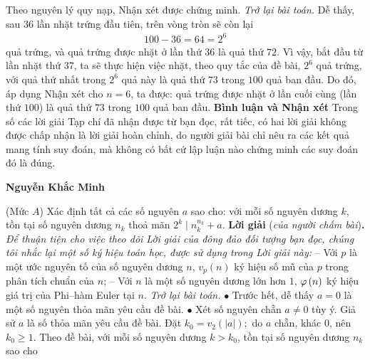 \begin{multicols}{2}
	\vskip 0.05cm
	Theo nguyên lý quy nạp, Nhận xét được chứng minh.
	\vskip 0.05cm
	\textit{Trở lại bài toán.}
	\vskip 0.05cm
	Dễ thấy, sau $36$ lần nhặt trứng đầu tiên, trên vòng tròn sẽ còn lại
	\begin{align*}
		100 - 36 = 64 = {2^6}
	\end{align*}
	quả trứng, và quả trứng được nhặt ở lần thứ $36$ là quả thứ $ 72$.
	\vskip 0.05cm
	Vì vậy, bắt đầu từ lần nhặt thứ $37$, ta sẽ thực hiện việc nhặt, theo quy tắc của đề bài, $2^6$  quả trứng, với quả thứ nhất trong $2^6$  quả này là quả thứ $73$ trong $100$ quả ban đầu. Do đó, áp dụng Nhận xét cho $n = 6$, ta được: quả trứng được nhặt ở lần cuối cùng (lần thứ $100$) là quả thứ $73$ trong $100$ quả ban đầu.
	\vskip 0.05cm
	\textbf{\color{thachthuctoanhoc}Bình luận và Nhận xét}
	\vskip 0.05cm
	Trong số các lời giải Tạp chí đã nhận được từ bạn đọc, rất tiếc, có hai lời giải không được chấp nhận là lời giải hoàn chỉnh, do người giải bài chỉ nêu ra các kết quả mang tính suy đoán, mà không có bất cứ lập luận nào chứng minh các suy đoán đó là đúng.
	\begin{flushright}
		\textbf{\color{thachthuctoanhoc}Nguyễn Khắc Minh}
	\end{flushright}
	{}
	(Mức $A$) Xác định tất cả các số nguyên $a$ sao cho: với mỗi số nguyên dương $k$, tồn tại số nguyên dương $n_k$ thoả mãn $2^k\mid n_k^{n_k}+a$. 
	\vskip 0.05cm
	\textbf{\color{thachthuctoanhoc}Lời giải} (\textit{của người chấm bài})\textbf{\color{thachthuctoanhoc}.}
	\vskip 0.05cm
	\textit{Để thuận tiện cho việc theo dõi Lời giải của đông đảo đối tượng bạn đọc, chúng tôi nhắc lại một số ký hiệu toán học, được sử dụng trong Lời giải này:}
	\vskip 0.05cm
	-- Với $p$ là một ước nguyên tố của số nguyên dương $n$, ${v_p}\left( n \right)$ ký hiệu số mũ của $p$ trong phân tích chuẩn của $n$;
	\vskip 0.05cm
	-- Với $n$ là một số nguyên dương lớn hơn $1$,  ${\rm{\varphi }}\left( n \right)$ ký hiệu giá trị của Phi--hàm Euler tại $n$.
	\vskip 0.05cm
	\textit{Trở lại bài toán.}
	\vskip 0.05cm
	$\bullet$ Trước hết, dễ thấy $a = 0$ là một số nguyên thỏa mãn yêu cầu đề bài.
	\vskip 0.05cm
	$\bullet$ Xét số nguyên chẵn $a \ne  0$ tùy ý.
	\vskip 0.05cm
	Giả sử $a$ là số thỏa mãn yêu cầu đề bài.
	\vskip 0.05cm
	Đặt ${k_0} = {v_2}\left( {|a|} \right);$  do $a$ chẵn, khác $0$, nên $k_0 \ge 1$.
	\vskip 0.05cm  
	Theo đề bài, với mỗi số nguyên dương \linebreak$k > k_0$,  tồn tại số nguyên dương $n_k$   sao cho
	\begin{align*}

\end{align*}
\end{multicols}
